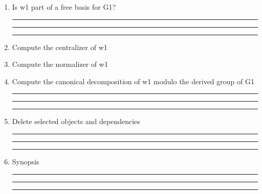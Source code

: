 \begin{enumerate}
\item Is w1 part of a free basis for G1?

\bigskip
\hrule\hrule\hrule

\item Compute the centralizer of w1

\item Compute the normalizer of w1

\item Compute the canonical decomposition of w1 modulo the derived
group of G1

\bigskip
\hrule\hrule\hrule

\item Delete selected objects and dependencies

\bigskip
\hrule\hrule\hrule

\item
Synopsis

\bigskip
\hrule\hrule\hrule

\end{enumerate}
